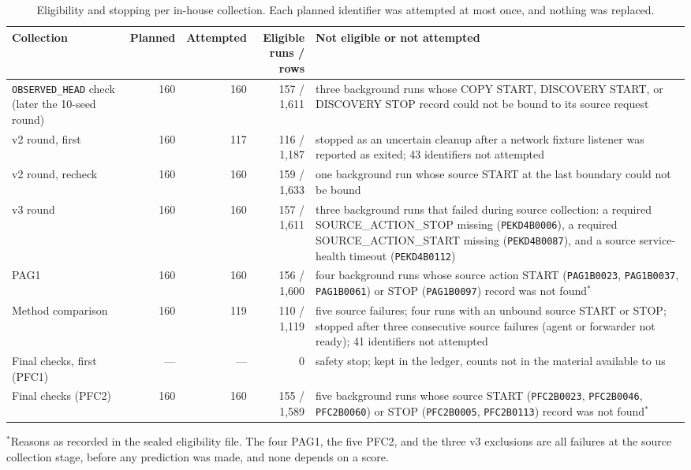 \begin{table}[htbp]
\centering
\caption[Eligibility and stopping per in-house collection]{Eligibility and stopping per in-house collection. Each planned
identifier was attempted at most once, and nothing was replaced.}
\label{tab:repro-eligibility}
\small
\begin{tabularx}{\textwidth}{@{}>{\raggedright\arraybackslash}p{3.1cm}rrr>{\raggedright\arraybackslash}X@{}}
\toprule
Collection & Planned & Attempted & \shortstack[r]{Eligible\\runs / rows} & Not eligible or not attempted \\
\midrule
\texttt{OBSERVED\_HEAD} check (later the 10-seed round) & 160 & 160 & 157 / 1,611
  & three background runs whose COPY START, DISCOVERY START, or DISCOVERY
    STOP record could not be bound to its source request \\
v2 round, first & 160 & 117 & 116 / 1,187
  & stopped as an uncertain cleanup after a network fixture listener was
    reported as exited; 43 identifiers not attempted \\
v2 round, recheck & 160 & 160 & 159 / 1,633
  & one background run whose source START at the last boundary could not
    be bound \\
v3 round & 160 & 160 & 157 / 1,611
  & three background runs that failed during source collection: a
    required SOURCE\_ACTION\_STOP missing (\texttt{PEKD4B0006}), a required
    SOURCE\_ACTION\_START missing (\texttt{PEKD4B0087}), and a source
    service-health timeout (\texttt{PEKD4B0112}) \\
PAG1 & 160 & 160 & 156 / 1,600
  & four background runs whose source action START (\texttt{PAG1B0023},
    \texttt{PAG1B0037}, \texttt{PAG1B0061}) or STOP (\texttt{PAG1B0097})
    record was not found$^{*}$ \\
Method comparison & 160 & 119 & 110 / 1,119
  & five source failures; four runs with an unbound source START or STOP;
    stopped after three consecutive source failures (agent or forwarder
    not ready); 41 identifiers not attempted \\
Final checks, first (PFC1) & --- & --- & 0
  & safety stop; kept in the ledger, counts not in the material available to us \\
Final checks (PFC2) & 160 & 160 & 155 / 1,589
  & five background runs whose source START (\texttt{PFC2B0023},
    \texttt{PFC2B0046}, \texttt{PFC2B0060}) or STOP (\texttt{PFC2B0005},
    \texttt{PFC2B0113}) record was not found$^{*}$ \\
\bottomrule
\end{tabularx}
\par\smallskip
\begin{minipage}{\textwidth}\footnotesize{}
$^{*}$Reasons as recorded in the sealed eligibility file. The four PAG1,
the five PFC2, and the three v3 exclusions are all failures at the
source collection stage, before any prediction was made, and none
depends on a score.
\end{minipage}
\end{table}
